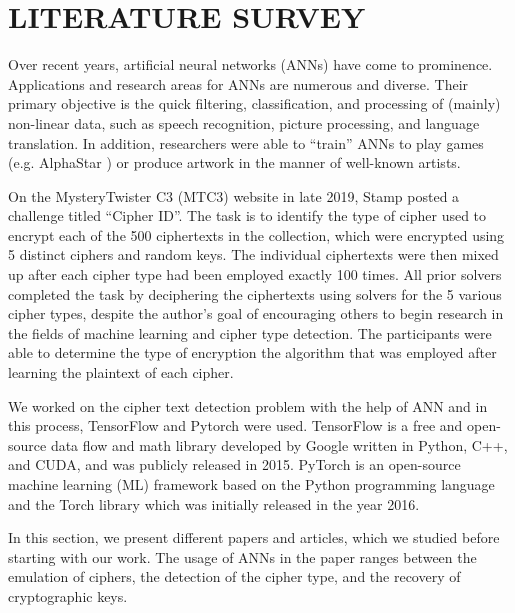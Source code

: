 \documentclass[a4paper]{article}
\begin{document}
\newpage

\section{LITERATURE SURVEY}

Over recent years, artificial neural networks (ANNs) have 
come to prominence. Applications and research areas for ANNs are numerous and diverse. Their primary objective is the quick filtering, classification, and processing of (mainly) non-linear data, such as speech recognition, picture processing, and language translation. In addition, researchers were able to “train” ANNs to play games (e.g. AlphaStar \cite{AlphaStar:online}) or produce artwork in the manner of well-known artists.

On the MysteryTwister C3\cite{Welcomet7:online} (MTC3) website 
in late 2019, Stamp posted a challenge titled “Cipher ID”. The 
task is to identify the type of cipher used to encrypt each 
of the 500 ciphertexts in the collection, which were encrypted 
using 5 distinct ciphers and random keys. The individual ciphertexts 
were then mixed up after each cipher type had been employed 
exactly 100 times. All prior solvers completed the task by deciphering 
the ciphertexts using solvers for the 5 various cipher types, 
despite the author's goal of encouraging others to begin research 
in the fields of machine learning and cipher type detection. 
The participants were able to determine the type of encryption 
the algorithm that was employed after learning the plaintext of each cipher.

We worked on the cipher text detection problem with the help of ANN 
and in this process, TensorFlow and Pytorch were used. TensorFlow 
is a free and open-source data flow and math library developed 
by Google written in Python, C++, and CUDA, and was publicly
released in 2015. PyTorch is an open-source machine learning (ML) 
framework based on the Python programming language and the Torch 
library which was initially released in the year 2016.

In this section, we present different papers and articles, which 
we studied before starting with our work. The usage of ANNs 
in the paper ranges between the emulation of ciphers, the detection 
of the cipher type, and the recovery of cryptographic keys.
\end{document}
